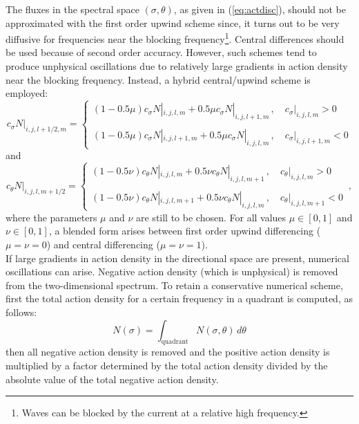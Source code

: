 \documentclass[12pt]{book}
\begin{document}
The fluxes in the spectral space $(\sigma,\theta)$, as given in (\ref{eq:actdisc}), should not be approximated
with the first order upwind scheme since, it turns out to be very diffusive for frequencies near the blocking
frequency\footnote{Waves can be blocked by the current at a relative high frequency.}. Central differences
should be used because of second order accuracy. However, such schemes tend to produce unphysical oscillations
due to relatively large gradients in action density near the blocking frequency. Instead, a hybrid
central/upwind scheme is employed:
\begin{equation}
  c_\sigma N|_{i,j,l+1/2,m} = \left\{
                               \begin{array}{l}
                                (1 - 0.5 \mu) c_\sigma N|_{i,j,l,m} + 0.5 \mu c_\sigma N|_{i,j,l+1,m}\,,
                                \quad c_\sigma|_{i,j,l,m} > 0 \\
                                \\
                                (1 - 0.5 \mu) c_\sigma N|_{i,j,l+1,m} + 0.5 \mu c_\sigma N|_{i,j,l,m}\,,
                                \quad c_\sigma|_{i,j,l+1,m} < 0
                              \end{array}
                             \right.
  \label{eq:fluxs}
\end{equation}
and
\begin{equation}
  c_\theta N|_{i,j,l,m+1/2} = \left\{
                               \begin{array}{l}
                                (1 - 0.5 \nu) c_\theta N|_{i,j,l,m} + 0.5 \nu c_\theta N|_{i,j,l,m+1}\,,
                                \quad c_\theta|_{i,j,l,m} > 0 \\
                                \\
                                (1 - 0.5 \nu) c_\theta N|_{i,j,l,m+1} + 0.5 \nu c_\theta N|_{i,j,l,m}\,,
                                \quad c_\theta|_{i,j,l,m+1} < 0
                              \end{array}
                             \right.\, ,
  \label{eq:fluxt}
\end{equation}
where the parameters $\mu$ and $\nu$ are still to be chosen. For all values $\mu \in [0,1]$ and $\nu \in [0,1]$,
a blended form arises between first order upwind differencing ($\mu = \nu = 0$) and central differencing
($\mu = \nu = 1$).
\\[2ex]
\noindent
If large gradients in action density in the directional space are present, numerical oscillations can
arise. Negative action density (which is unphysical) is removed from the two-dimensional spectrum. To
retain a conservative numerical scheme, first the total action density for a certain frequency in a
quadrant is computed, as follows:
\begin{equation}
  N(\sigma) = \int_{\mbox{quadrant}} N(\sigma,\theta)\, d\theta
\end{equation}
then all negative action density is removed and the positive action density is multiplied by a factor
determined by the total action density divided by the absolute value of the total negative action
density.
\end{document}
